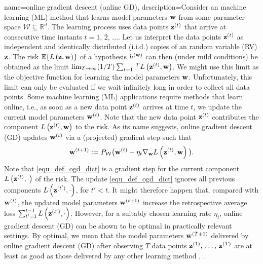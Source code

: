 {
{name={online gradient descent (online GD)}, 
	description={Consider  an machine learning (ML) method that learns model parameters 
		${\bf w}$ from some parameter space $\mathcal{W} \subseteq \mathbb{R}^{d}$. 
		The learning process uses data points ${\bf z}^{(t)}$ that arrive at consecutive time instants $t=1, \,2, \,\dots$. 
		Let us interpret the data points ${\bf z}^{(t)}$ as independent and identically distributed (i.i.d.) copies 
		of an random variable (RV) ${\bf z}$. The risk $\mathbb{E} \{ L\left({\bf z},{\bf w} \right) \}$ of a 
		hypothesis $h^{({\bf w})}$ can then (under mild conditions) be obtained as the limit 
		$\lim_{T\rightarrow \infty} (1/T)\sum_{t=1}\,^{T} L\left({\bf z}^{(t)},{\bf w} \right)$. 
		We might use this limit as the objective function for learning the model parameters ${\bf w}$. 
		Unfortunately, this limit can only be evaluated if we wait infinitely long in order to collect all data points. 
		Some machine learning (ML) applications require methods that learn online, i.e., as soon as a new data point ${\bf z}^{(t)}$ 
		arrives at time $t$, we update the current model parameters ${\bf w}^{(t)}$. Note that 
		the new data point ${\bf z}^{(t)}$ contributes the component $L\left({\bf z}^{(t)},{\bf w} \right)$ 
		to the risk. As its name suggests, online gradient descent (GD) updates ${\bf w}^{(t)}$ via a (projected) gradient step such that
		\begin{equation} 
			\label{equ_def_ogd_dict}
 			{\bf w}^{(t+1)} := P_{\mathcal{W}}\big( {\bf w}^{(t)} - \eta_{t} \nabla_{{\bf w}} L\left({\bf z}^{(t)},{\bf w} \right)\big) . 
		\end{equation} 
		Note that \eqref{equ_def_ogd_dict} is a gradient step for the current component $L\left({\bf z}^{(t)},\cdot \right)$ 
		of the risk. The update \eqref{equ_def_ogd_dict} ignores all previous components $L\left({\bf z}^{(t')},\cdot \right)$, 
		for $t' < t$. It might therefore happen that, compared with ${\bf w}^{(t)}$, the updated model parameters 
		${\bf w}^{(t+1)}$ increase the retrospective average loss $\sum_{t'=1}^{t-1} L\left({\bf z}^{(t')},\cdot \right)$. 
		However, for a suitably chosen learning rate $\eta_{t}$, online gradient descent (GD) can be shown 
		to be optimal in practically relevant settings. By optimal, we mean that the model parameters 
		${\bf w}^{(T+1)}$ delivered by online gradient descent (GD) after observing $T$ data points ${\bf z}^{(1)}, \,\ldots, \,{\bf z}^{(T)}$ 
		are at least as good as those delivered by any other learning method \cite{HazanOCO}, \cite{GDOptimalRakhlin2012}. 
}}}
